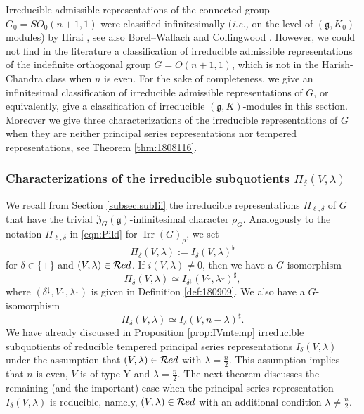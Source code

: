 Irreducible admissible representations
 of the connected group $G_0=SO_0(n+1,1)$
 were classified infinitesimally
 ({\it{i.e.,}} on the level of $({\mathfrak{g}}, K_0)$-modules)
 by Hirai \cite{Hirai62}, 
 see also Borel--Wallach \cite{BW}
 and Collingwood \cite[Chap.~5]{C}.  
However,
 we could not find in the literature
 a classification of irreducible admissible representations
 of the indefinite orthogonal group $G=O(n+1,1)$, 
 which is not in the Harish-Chandra class
 when $n$ is even.  
For the sake of completeness,
 we give an infinitesimal classification 
 of irreducible admissible representations of $G$, 
 or equivalently,
 give a classification
 of irreducible $({\mathfrak{g}}, K)$-modules
 in this section.  
Moreover we give three characterizations
 of the irreducible representations of $G$
 when they are neither principal series representations
 nor tempered representations, 
 see Theorem \ref{thm:1808116}.  



\subsubsection{Characterizations of the irreducible subquotients
 $\Pi_{\delta}(V,\lambda)$}

We recall from Section \ref{subsec:subIii}
 the irreducible representations $\Pi_{\ell, \delta}$
 of $G$
 that have the trivial ${\mathfrak{Z}}_G({\mathfrak{g}})$-infinitesimal character $\rho_G$.  
Analogously to the notation $\Pi_{\ell, \delta}$
 in \eqref{eqn:Pild}
 for $\operatorname{Irr}(G)_{\rho}$, 
 we set
\begin{equation}
\label{eqn:PiVlmd}
  \Pi_{\delta}(V,\lambda):=I_{\delta}(V, \lambda)^{\flat}
\end{equation}
for $\delta \in \{\pm\}$
 and $(V,\lambda) \in {\mathcal{R}}ed$.  
If $i(V,\lambda) \ne 0$, 
 then we have a $G$-isomorphism
\begin{equation}
\label{eqn:PiVlmddown}
  \Pi_{\delta}(V,\lambda) \simeq I_{\delta^{\downarrow}}(V^{\downarrow}, \lambda^{\downarrow})^{\sharp}, 
\end{equation}
where $(\delta^{\downarrow}, V^{\downarrow}, \lambda^{\downarrow})$
 is given in Definition \ref{def:180909}.  
We also have a $G$-isomorphism
\begin{equation}
\label{eqn:PiVlmddual}
  \Pi_{\delta}(V,\lambda) \simeq I_{\delta}(V, n-\lambda)^{\sharp}.  
\end{equation}
We have already discussed
 in Proposition \ref{prop:IVmtemp}
 irreducible subquotients
 of reducible tempered principal series representations
 $I_{\delta}(V, \lambda)$ 
under the assumption
 that $(V, \lambda)\in{\mathcal{R}}ed$
 with $\lambda=\frac n 2$.  
This assumption implies that $n$ is even, 
 $V$ is of type Y
 and $\lambda = \frac n 2$.  
The next theorem discusses the remaining
 (and the important) case
 when the principal series representation $I_{\delta}(V, \lambda)$ 
 is reducible, 
 namely, 
 $(V,\lambda) \in {\mathcal{R}}ed$
 with an additional condition $\lambda \ne \frac n 2$.  

